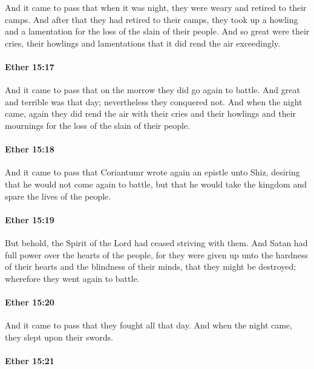 			And it came to pass that when it was night,
			they were weary and retired to their camps.
			And after that they had retired to their camps,
			they took up a howling and a lamentation for the loss of the slain of their people.
			And so great were their cries, their howlings and lamentations
			that it did rend the air exceedingly.

		\paragraph{Ether 15:17} %
			\label{ETHER-15-17}

			And it came to pass that on the morrow they did go again to battle.
			And great and terrible was that day;
			nevertheless they conquered not.
			And when the night came,
			again they did rend the air
			with their cries and their howlings and their mournings
			for the loss of the slain of their people.

		\paragraph{Ether 15:18} %
			\label{ETHER-15-18}

			And it came to pass that Coriantumr wrote again an epistle unto Shiz,
			desiring that he would not come again to battle,
			but that he would take the kingdom and spare the lives of the people.

		\paragraph{Ether 15:19} %
			\label{ETHER-15-19}

			But behold, the Spirit of the Lord had ceased striving with them.
			And Satan had full power over the hearts of the people,
			for they were given up unto the hardness of their hearts
			and the blindness of their minds,
			that they might be destroyed;
			wherefore they went again to battle.

		\paragraph{Ether 15:20} %
			\label{ETHER-15-20}

			And it came to pass that they fought all that day.
			And when the night came, they slept upon their swords.

		\paragraph{Ether 15:21} %
			\label{ETHER-15-21}


